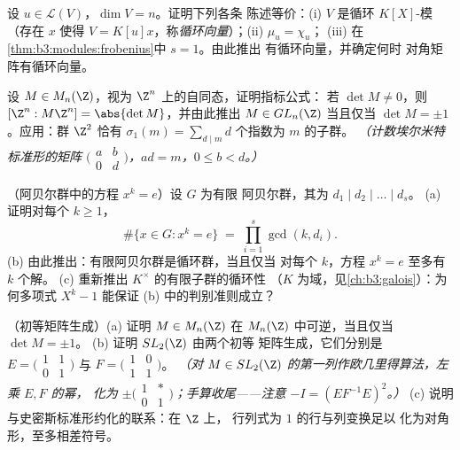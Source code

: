 \begin{exercise}[$\star\star\star$]\label{exo:b3:modules:9}
设 $u \in \mathcal L(V)$，$\dim V = n$。证明下列各条
陈述等价：(i) $V$ 是循环 $K[X]$-模（存在 $x$
使得 $V = K[u]x$，称\emph{循环向量}）；(ii) $\mu_u = \chi_u$；
(iii) 在\cref{thm:b3:modules:frobenius}中 $s = 1$。由此推出
有循环向量，并确定何时
对角矩阵有循环向量。
\end{exercise}

\begin{exercise}[$\star\star\star$]\label{exo:b3:modules:10}
设 $M \in M_n(\Z)$，视为 $\Z^n$ 上的自同态，证明指标公式：
若 $\det M \ne 0$，则
$[\Z^n : M\Z^n] = \abs{\det M}$，并由此推出 $M \in GL_n(\Z)$
当且仅当 $\det M = \pm 1$。应用：群 $\Z^2$ 恰有
$\sigma_1(m) = \sum_{d \mid m} d$ 个指数为 $m$ 的子群。
\emph{（计数埃尔米特标准形的矩阵 $\bigl(\begin{smallmatrix}
a & b\\ 0 & d\end{smallmatrix}\bigr)$，$ad = m$，$0 \leq b <
d$。）}
\end{exercise}

\begin{exercise}[$\star\star$]\label{exo:b3:modules:11}
（阿贝尔群中的方程 $x^k = e$）设 $G$ 为有限
阿贝尔群，其为 $d_1 \mid d_2 \mid \dots
\mid d_s$。
(a) 证明对每个 $k \geq 1$，
\[
\#\{x \in G : x^k = e\} \;=\; \prod_{i=1}^{s}\gcd(k, d_i) .
\]
(b) 由此推出：有限阿贝尔群是循环群，当且仅当
对每个 $k$，方程 $x^k = e$ 至多有 $k$
个解。
(c) 重新推出 $K^\times$ 的有限子群的循环性
（$K$ 为域，见\cref{ch:b3:galois}）：为何多项式
$X^k - 1$ 能保证 (b) 中的判别准则成立？
\end{exercise}

\begin{exercise}[$\star\star\star$]\label{exo:b3:modules:12}
（初等矩阵生成）(a) 证明 $M \in M_n(\Z)$
在 $M_n(\Z)$ 中可逆，当且仅当 $\det M = \pm1$。
(b) 证明 $SL_2(\Z)$ 由两个初等
矩阵生成，它们分别是
$E = \bigl(\begin{smallmatrix}1 & 1\\ 0 &
1\end{smallmatrix}\bigr)$ 与
$F = \bigl(\begin{smallmatrix}1 & 0\\ 1 &
1\end{smallmatrix}\bigr)$。
\emph{（对 $M
\in SL_2(\Z)$ 的第一列作欧几里得算法，左乘 $E, F$ 的幂，
化为 $\pm\bigl(\begin{smallmatrix}1 & *\\ 0 &
1\end{smallmatrix}\bigr)$；手算收尾——注意
$-I = (EF^{-1}E)^2$。）}
(c) 说明与史密斯标准形约化的联系：在 $\Z$ 上，
行列式为 $1$ 的行与列变换足以
化为对角形，至多相差符号。
\end{exercise}

